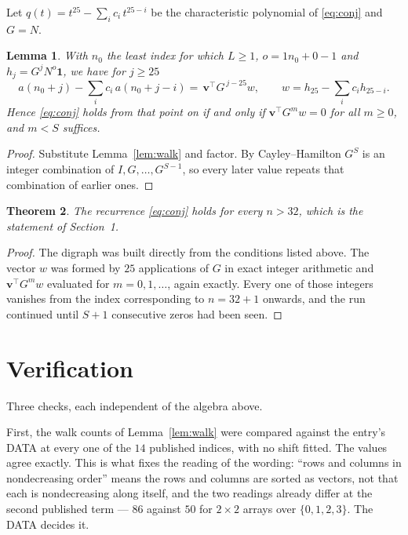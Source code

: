 \documentclass[11pt,a4paper]{article}
\theoremstyle{plain}
\newtheorem{theorem}{Theorem}
\newtheorem{lemma}[theorem]{Lemma}
\theoremstyle{definition}
\begin{document}
Let $q(t)=t^{25}-\sum_i c_i\,t^{25-i}$ be the characteristic polynomial of
\eqref{eq:conj} and $G=N$.

\begin{lemma}\label{lem:crit}
With $n_0$ the least index for which $L\ge1$, $o=1n_0+0-1$ and
$h_j=G^{j}N^{o}\mathbf{1}$, we have for $j\ge25$
\[
a(n_0+j)-\sum_i c_i\,a(n_0+j-i)=\,\mathbf{v}^{\!\top}G^{\,j-25}w,
\qquad w=h_{25}-\sum_i c_ih_{25-i} .
\]
Hence \eqref{eq:conj} holds from that point on if and only if
$\mathbf{v}^{\!\top}G^{m}w=0$ for all $m\ge0$, and $m<S$ suffices.
\end{lemma}

\begin{proof}
Substitute Lemma~\ref{lem:walk} and factor. By Cayley--Hamilton $G^{S}$ is an integer
combination of $I,G,\dots,G^{S-1}$, so every later value repeats that combination of
earlier ones.
\end{proof}

\begin{theorem}
The recurrence \eqref{eq:conj} holds for every $n>32$, which is the statement of
Section~1.
\end{theorem}

\begin{proof}
The digraph was built directly from the conditions listed above. The vector $w$ was formed by
$25$ applications of $G$ in exact integer arithmetic and $\mathbf{v}^{\!\top}G^{m}w$
evaluated for $m=0,1,\dots$, again exactly. Every one of those integers vanishes from the
index corresponding to $n=32+1$ onwards, and the run continued until $S+1$ consecutive
zeros had been seen.
\end{proof}

\section{Verification}

Three checks, each independent of the algebra above.

First, the walk counts of Lemma~\ref{lem:walk} were compared against the entry's DATA at
every one of the $14$ published indices, with no shift fitted. The values agree exactly.
This is what fixes the reading of the wording: ``rows and columns in nondecreasing order''
means the rows and columns are sorted as vectors, not that each is nondecreasing along
itself, and the two readings already differ at the second published term --- $86$ against
$50$ for $2\times2$ arrays over $\{0,1,2,3\}$. The DATA decides it.
\end{document}
